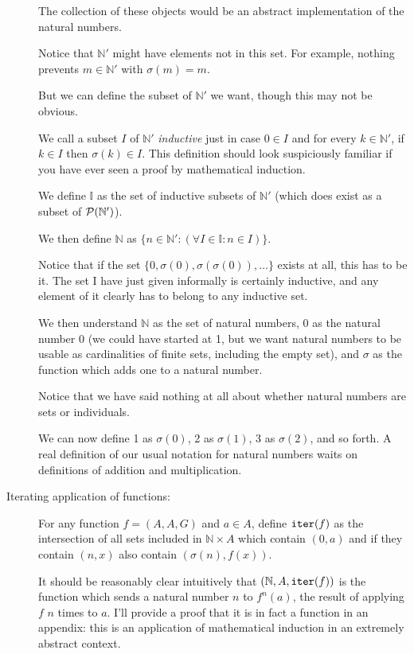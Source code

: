 \documentclass[12pt]{article}
\begin{document}
\begin{description}
The collection of these objects would be an abstract implementation of the natural numbers.

Notice that $\mathbb N'$ might have elements not in this set.  For example, nothing prevents $m \in \mathbb N'$ with
$\sigma(m)=m$.

But we can define the subset of $\mathbb N'$ we want, though this may not be obvious.

We call a subset $I$ of $\mathbb N'$ {\em inductive\/} just in case $0 \in I$ and for every $k \in \mathbb N'$, if
$k \in I$ then $\sigma(k) \in I$.  This definition should look suspiciously familiar if you have ever seen a proof by mathematical induction.

We define $\mathbb I$ as the set of inductive subsets of $\mathbb N'$ (which does exist as a subset of ${\cal P}(\mathbb N')$).

We then define $\mathbb N$ as $\{n \in \mathbb N':(\forall I \in {\mathbb I}:n \in I)\}$.

Notice that if the set $\{0, \sigma(0), \sigma(\sigma(0)),\ldots\}$  exists at all, this has to be it.  The set I have just given informally is certainly inductive, and any element of it clearly has to belong to any inductive set.

We then understand $\mathbb N$ as the set of natural numbers, 0 as the natural number 0 (we could have started at 1, but we want natural numbers to be usable as cardinalities of finite sets, including the empty set), and $\sigma$ as the function which adds one to a natural number.

Notice that we have said nothing at all about whether natural numbers are sets or individuals.

We can now define 1 as $\sigma(0)$, 2 as $\sigma(1)$, 3 as $\sigma(2)$, and so forth.  A real definition of our usual notation for natural numbers waits on definitions of addition and multiplication.

\item[Iterating application of functions:]

For any function $f = (A,A,G)$ and $a \in A$, define ${\tt iter}(f)$ as the intersection of all sets included in $\mathbb N \times A$ which contain
$(0,a)$ and if they contain $(n,x)$ also contain $(\sigma(n),f(x))$.

It should be reasonably clear intuitively that $(\mathbb N,A,{\tt iter}(f))$ is the function which sends a natural number $n$ to $f^n(a)$, the result of applying $f$ $n$ times to $a$.  I'll provide a proof that it is in fact a function in an appendix:  this is an application of mathematical induction in an extremely abstract context.


\end{description}
\end{document}

